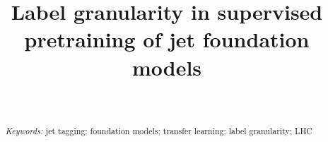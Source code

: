 \documentclass[12pt]{article}   %
\title{Label granularity in supervised pretraining of jet foundation models}
\author{\pending{author list and affiliations}\\[4pt] \pending{ORCIDs}}
\date{}
\begin{document}
\maketitle

\begin{abstract}

\par\medskip\noindent\textit{Keywords:} jet tagging; foundation models; transfer learning; label granularity; LHC %
\end{abstract}









\FloatBarrier


\FloatBarrier
\appendix


\FloatBarrier


\end{document}

